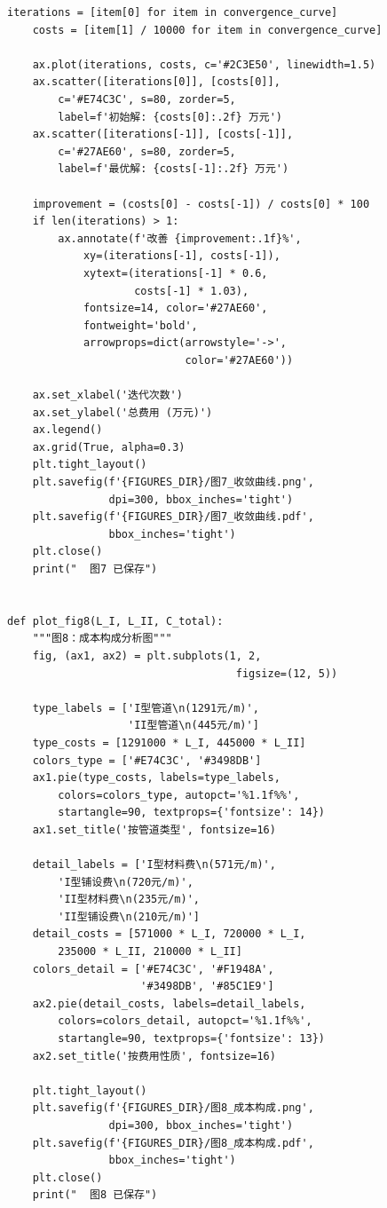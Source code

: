 \documentclass[12pt,a4paper]{ctexart}
\theoremstyle{definition}
\theoremstyle{plain}
\theoremstyle{remark}
\begin{document}
\begin{lstlisting}[caption={\texttt{visualization.py}：论文图表生成}]
    iterations = [item[0] for item in convergence_curve]
    costs = [item[1] / 10000 for item in convergence_curve]

    ax.plot(iterations, costs, c='#2C3E50', linewidth=1.5)
    ax.scatter([iterations[0]], [costs[0]],
        c='#E74C3C', s=80, zorder=5,
        label=f'初始解: {costs[0]:.2f} 万元')
    ax.scatter([iterations[-1]], [costs[-1]],
        c='#27AE60', s=80, zorder=5,
        label=f'最优解: {costs[-1]:.2f} 万元')

    improvement = (costs[0] - costs[-1]) / costs[0] * 100
    if len(iterations) > 1:
        ax.annotate(f'改善 {improvement:.1f}%',
            xy=(iterations[-1], costs[-1]),
            xytext=(iterations[-1] * 0.6,
                    costs[-1] * 1.03),
            fontsize=14, color='#27AE60',
            fontweight='bold',
            arrowprops=dict(arrowstyle='->',
                            color='#27AE60'))

    ax.set_xlabel('迭代次数')
    ax.set_ylabel('总费用 (万元)')
    ax.legend()
    ax.grid(True, alpha=0.3)
    plt.tight_layout()
    plt.savefig(f'{FIGURES_DIR}/图7_收敛曲线.png',
                dpi=300, bbox_inches='tight')
    plt.savefig(f'{FIGURES_DIR}/图7_收敛曲线.pdf',
                bbox_inches='tight')
    plt.close()
    print("  图7 已保存")


def plot_fig8(L_I, L_II, C_total):
    """图8：成本构成分析图"""
    fig, (ax1, ax2) = plt.subplots(1, 2,
                                    figsize=(12, 5))

    type_labels = ['I型管道\n(1291元/m)',
                   'II型管道\n(445元/m)']
    type_costs = [1291000 * L_I, 445000 * L_II]
    colors_type = ['#E74C3C', '#3498DB']
    ax1.pie(type_costs, labels=type_labels,
        colors=colors_type, autopct='%1.1f%%',
        startangle=90, textprops={'fontsize': 14})
    ax1.set_title('按管道类型', fontsize=16)

    detail_labels = ['I型材料费\n(571元/m)',
        'I型铺设费\n(720元/m)',
        'II型材料费\n(235元/m)',
        'II型铺设费\n(210元/m)']
    detail_costs = [571000 * L_I, 720000 * L_I,
        235000 * L_II, 210000 * L_II]
    colors_detail = ['#E74C3C', '#F1948A',
                     '#3498DB', '#85C1E9']
    ax2.pie(detail_costs, labels=detail_labels,
        colors=colors_detail, autopct='%1.1f%%',
        startangle=90, textprops={'fontsize': 13})
    ax2.set_title('按费用性质', fontsize=16)

    plt.tight_layout()
    plt.savefig(f'{FIGURES_DIR}/图8_成本构成.png',
                dpi=300, bbox_inches='tight')
    plt.savefig(f'{FIGURES_DIR}/图8_成本构成.pdf',
                bbox_inches='tight')
    plt.close()
    print("  图8 已保存")



\end{lstlisting}
\end{document}
